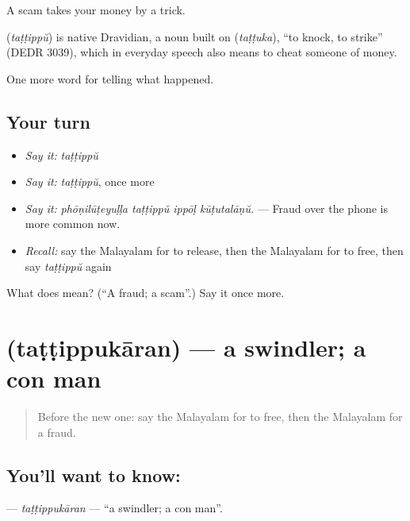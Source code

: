A scam takes your money by a trick.

\begin{cousinweb}
\textbf{} (\emph{taṭṭippŭ}) is native Dravidian, a noun built on  (\emph{taṭṭuka}), \textquotedblleft{}to knock, to strike\textquotedblright{} (DEDR 3039), which in everyday speech also means to cheat someone of money.
\end{cousinweb}

\begin{grammarlens}[title={What you've built}]
One more word for telling what happened.
\end{grammarlens}

\subsection*{Your turn}
\begin{itemize}
\raggedright
  \item \emph{Say it:} \emph{taṭṭippŭ}
  \item \emph{Say it:} \emph{taṭṭippŭ}, once more
  \item \emph{Say it:} \emph{phōṇilūṭeyuḷḷa taṭṭippŭ ippōḷ kūṭutalāṇŭ.} — Fraud over the phone is more common now.
  \item \emph{Recall:} say the Malayalam for to release, then the Malayalam for to free, then say \emph{taṭṭippŭ} again
\end{itemize}

\begin{tcolorbox}[breakable,colback=teal!4,colframe=teal!35!black,title={Before you move on}]
What does  mean? (\textquotedblleft{}A fraud; a scam\textquotedblright{}.) Say it once more.
\end{tcolorbox}
\section[\texorpdfstring{\ml{തട്ടിപ്പുകാരൻ} (taṭṭippukāran)}{തട്ടിപ്പുകാരൻ (taṭṭippukāran)}]{ (taṭṭippukāran) — a swindler; a con man}

\label{lesson:ML-C372-tattippukaran}



\begin{quote}
Before the new one: say the Malayalam for to free, then the Malayalam for a fraud.
\end{quote}

\subsection*{You'll want to know: }
\textbf{} — \emph{taṭṭippukāran} — \textquotedblleft{}a swindler; a con man\textquotedblright{}.

